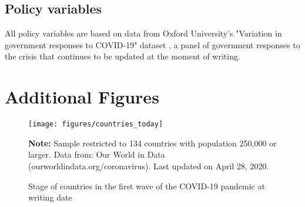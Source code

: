 \documentclass[12pt,english]{article}
\begin{document}
\subsection{Policy variables}

All policy variables are based on data from Oxford University's "Variation in government responses to COVID-19" dataset  \citep{Hale2020}, a panel of government responses to the crisis that continues to be updated at the moment of writing.

\newpage
\section{Additional Figures\label{sec:Figures}}
\begin{spacing}{0.40000000000000002}

\setcounter{figure}{0}
\renewcommand\appendix{\par
  \renewcommand\thefigure{A\arabic{figure}}}
\appendix
\renewcommand*{\theHfigure}{\arabic{section}.{A\arabic{figure}}}


\begin{figure}[H]
	\singlespacing
	\centering
	 \caption{Stage of countries in the first wave of the COVID-19 pandemic at writing date}  \label{fig:current_stage}
	\resizebox{0.8\width}{!} {
		\begin{threeparttable}

 			  \texttt{[image: figures/countries\_today]}
  			 \begin{tablenotes}[flushleft]\vspace*{-7bp}
			\item \textbf{Note:} Sample restricted to 134 countries with population 250,000 or larger. Data from: Our World in Data (ourworldindata.org/coronavirus). Last updated on April 28, 2020.
			 \end{tablenotes}
  		\end{threeparttable}
 		}
  	 \onehalfspacing
\end{figure}

\end{spacing}
\end{document}
